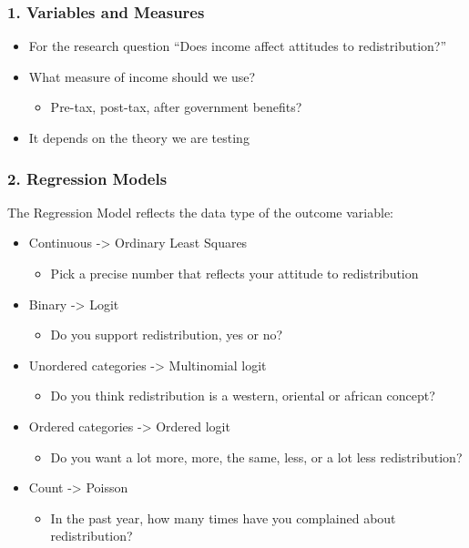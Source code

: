 \documentclass[xcolor=x11names,compress]{beamer}\usepackage[]{graphicx}\usepackage[]{color}
\renewcommand{\(}{\begin{columns}}
\renewcommand{\)}{\end{columns}}
\newcommand{\<}[1]{\begin{column}{#1}}
\renewcommand{\>}{\end{column}}
\begin{document}
\begin{frame}
\frametitle{1. Variables and Measures}
\begin{itemize}
\item For the research question ``Does income affect attitudes to redistribution?''
\pause
\item What measure of income should we use?
\pause
\begin{itemize}
\item Pre-tax, post-tax, after government benefits?
\end{itemize}
\item It depends on the theory we are testing
\end{itemize}
\end{frame}

\begin{frame}
\frametitle{2. Regression Models}
The Regression Model reflects the data type of the outcome variable:
\begin{itemize}
\item Continuous -> Ordinary Least Squares  
\begin{itemize}
\item Pick a precise number that reflects your attitude to redistribution
\end{itemize}
\item Binary -> Logit  
\begin{itemize}
\item Do you support redistribution, yes or no?
\end{itemize}
\item Unordered categories -> Multinomial logit  
\begin{itemize}
\item Do you think redistribution is a western, oriental or african concept?
\end{itemize}
\item Ordered categories -> Ordered logit  
\begin{itemize}
\item Do you want a lot more, more, the same, less, or a lot less redistribution?
\end{itemize}
\item Count -> Poisson  
\begin{itemize}
\item In the past year, how many times have you complained about redistribution?
\end{itemize}
\end{itemize}
\end{frame}
\end{document}
